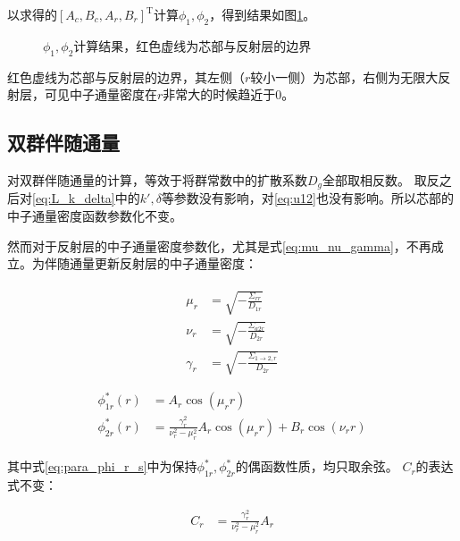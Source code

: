 以求得的$\left[A_c,B_c,A_r,B_r\right]^{\mathrm{T}}$计算$\phi_1,\phi_2$，得到结果如图\ref{fig:flux_r}。

\begin{figure}[H]
    \centering
    
    \caption{$\phi_1,\phi_2$计算结果，红色虚线为芯部与反射层的边界}
    \label{fig:flux_r}
\end{figure}

红色虚线为芯部与反射层的边界，其左侧（$r$较小一侧）为芯部，右侧为无限大反射层，可见中子通量密度在$r$非常大的时候趋近于$0$。

\subsection{双群伴随通量}

对双群伴随通量的计算，等效于将群常数中的扩散系数$D_g$全部取相反数。
取反之后对\ref{eq:L_k_delta}中的$k',\delta$等参数没有影响，对\ref{eq:u12}也没有影响。所以芯部的中子通量密度函数参数化不变。

然而对于反射层的中子通量密度参数化，尤其是式\ref{eq:mu_nu_gamma}，不再成立。为伴随通量更新反射层的中子通量密度：

\begin{align}
    \label{eq:mu_nu_gamma_s}
    \begin{split}
        \mu_r &= \sqrt{-\frac{\Sigma_{rr}}{D_{1r}}} \\
        \nu_r &= \sqrt{-\frac{\Sigma_{a2r}}{D_{2r}}} \\
        \gamma_r &= \sqrt{-\frac{\Sigma_{1\rightarrow 2,r}}{D_{2r}}} \\
    \end{split}
\end{align}
\begin{align}
    \label{eq:para_phi_r_s}
    \begin{split}
        \phi_{1r}^*(r) &= A_r \cos(\mu_r r) \\
        \phi_{2r}^*(r) &= \frac{\gamma_r^2}{\nu_r^2 - \mu_r^2}A_r \cos(\mu_r r) + B_r \cos(\nu_r r)
    \end{split}
\end{align}

其中式\ref{eq:para_phi_r_s}中为保持$\phi_{1r}^*,\phi_{2r}^*$的偶函数性质，均只取余弦。
$C_r$的表达式不变：

\begin{align}
    C_r &= \frac{\gamma_r^2}{\nu_r^2 - \mu_r^2}A_r
\end{align}

